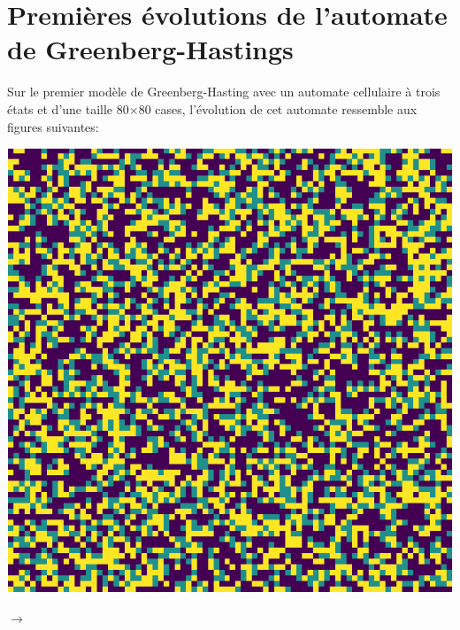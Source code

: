 \documentclass[12pt, a4paper]{article}
\begin{document}
    
    \section{Premières évolutions de l'automate de Greenberg-Hastings}
        \begin{flushleft}
            Sur le premier modèle de Greenberg-Hasting avec un automate cellulaire à trois états et d'une taille 80$\times$80 cases, l'évolution de cet automate ressemble aux figures suivantes:
        \end{flushleft}
        \begin{center}
            \begin{minipage}{.17\linewidth}
                \includegraphics[scale=0.15]{img/part1/step1.png}
            \end{minipage}
            $\rightarrow$
            \begin{minipage}{.17\linewidth}

\end{minipage}
\end{center}
\end{document}
